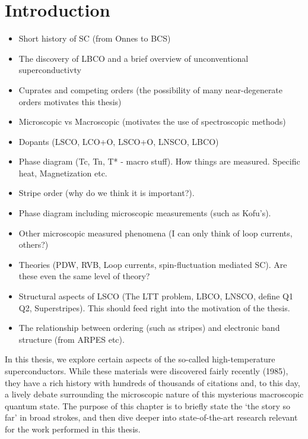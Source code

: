 \chapter{Introduction}

\begin{framed}
    \begin{itemize}
        \item Short history of SC (from Onnes to BCS)
        \item The discovery of LBCO and a brief overview of unconventional superconductivty
        \item Cuprates and competing orders (the possibility of many near-degenerate orders motivates this thesis)
        \item Microscopic vs Macroscopic (motivates the use of spectroscopic methods)
        \item Dopants (LSCO, LCO+O, LSCO+O, LNSCO, LBCO)
        \item Phase diagram (Tc, Tn, T* - macro stuff). How things are measured. Specific heat, Magnetization etc.
        \item Stripe order (why do we think it is important?). 
        \item Phase diagram including microscopic measurements (such as Kofu's).
        \item Other microscopic measured phenomena (I can only think of loop currents, others?)
        \item Theories (PDW, RVB, Loop currents, spin-fluctuation mediated SC). Are these even the same level of theory?
        \item Structural aspects of LSCO (The LTT problem, LBCO, LNSCO, define Q1 Q2, Superstripes). This should feed right into the motivation of the thesis.
        \item The relationship between ordering (such as stripes) and electronic band structure (from ARPES etc).
    \end{itemize}
\end{framed}

In this thesis, we explore certain aspects of the so-called high-temperature superconductors. While these materials were discovered fairly recently (1985), they have a rich history with hundreds of thousands of citations and, to this day, a lively debate surrounding the microscopic nature of this mysterious macroscopic quantum state. The purpose of this chapter is to briefly state the `the story so far' in broad strokes, and then dive deeper into state-of-the-art research relevant for the work performed in this thesis. 

